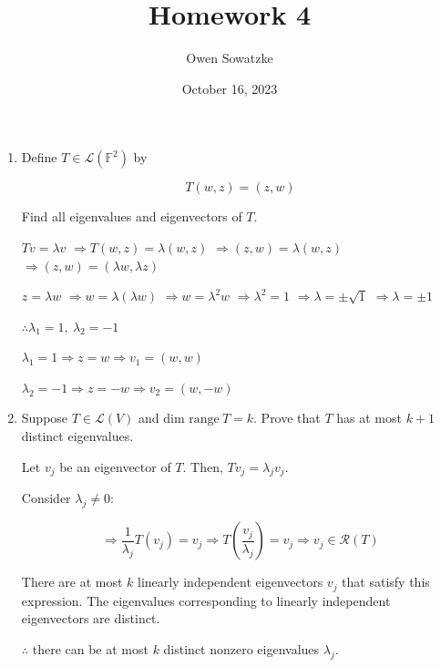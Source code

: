 \documentclass[fleqn]{article}
\title{Homework 4}
\author{Owen Sowatzke}
\date{October 16, 2023}
\makeatletter
\newcommand{\zerodisplayskip}{
	\setlength{\abovedisplayskip}{0pt}%
	\setlength{\belowdisplayskip}{0pt}%
	\setlength{\abovedisplayshortskip}{0pt}%
	\setlength{\belowdisplayshortskip}{0pt}%
	\setlength{\mathindent}{0pt}}
\newenvironment{equationCenter}{\@fleqnfalse\begin{equation*}}{\end{equation*}}
\makeatother
\begin{document}
	\offinterlineskip
	\setlength{\lineskip}{12pt}
	\zerodisplayskip
	\maketitle
	
	\begin{enumerate}[nolistsep]
		\item Define $T \in \mathcal{L}(\mathbb{F}^2)$ by
		
			\begin{equationCenter}
				T(w,z) = (z,w)
			\end{equationCenter}
			
			Find all eigenvalues and eigenvectors of $T$.
	
			$Tv = {\lambda}v$
			$\Rightarrow T(w,z) = \lambda(w,z)$
			$\Rightarrow(z,w) = \lambda(w,z)$
			$\Rightarrow(z,w) = ({\lambda}w,{\lambda}z)$
			
			$z = {\lambda}w$
			$\Rightarrow w = \lambda({\lambda}w)$
			$\Rightarrow w = {\lambda}^2 w$
			$\Rightarrow {\lambda}^2 = 1$
			$\Rightarrow \lambda = \pm \sqrt{1}$
			$\Rightarrow \lambda = \pm 1$
			
			$\therefore \lambda_1 = 1,\ \lambda_2 = -1$
			
			$\lambda_1 = 1 \Rightarrow z = w \Rightarrow v_1 = (w, w)$
			
			$\lambda_2 = -1 \Rightarrow z = -w \Rightarrow v_2 = (w, -w)$
			
		\item Suppose $T \in \mathcal{L}(V)$ and $\text{dim range}\ T = k$. Prove that $T$ has at most $k + 1$ distinct eigenvalues.
	
			Let $v_j$ be an eigenvector of $T$. Then, $Tv_j = {\lambda_j}v_j$.
			
			Consider $\lambda_j \neq 0$:
			
			\begin{equation*}
				\Rightarrow \frac{1}{\lambda_j}T(v_j) = v_j \Rightarrow T\left(\frac{v_j}{\lambda_j}\right) = v_j	 \Rightarrow v_j \in \mathcal{R}(T)			
			\end{equation*}
			
			There are at most $k$ linearly independent eigenvectors $v_j$ that satisfy this expression. The eigenvalues corresponding to linearly independent eigenvectors are distinct.
			
			$\therefore$ there can be at most $k$ distinct nonzero eigenvalues $\lambda_j$.
			

\end{enumerate}
\end{document}
